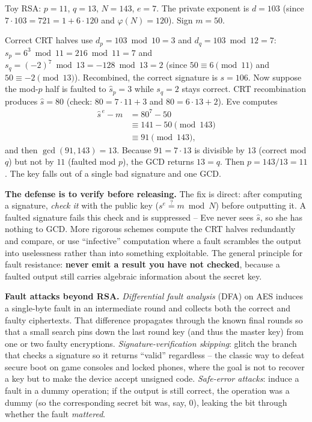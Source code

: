 \begin{example}
\label{ch37:bellcore-example}
Toy RSA: $p = 11$, $q = 13$, $N = 143$, $e = 7$. The private exponent is $d = 103$ (since $7 \cdot 103 = 721 = 1 + 6\cdot 120$ and $\varphi(N)=120$). Sign $m = 50$.

Correct CRT halves use $d_p = 103 \bmod 10 = 3$ and $d_q = 103 \bmod 12 = 7$: $s_p = 6^{3} \bmod 11 = 216 \bmod 11 = 7$ and $s_q = (-2)^{7} \bmod 13 = -128 \bmod 13 = 2$ (since $50 \equiv 6 \pmod{11}$ and $50 \equiv -2 \pmod{13}$). Recombined, the correct signature is $s = 106$. Now suppose the mod-$p$ half is faulted to $\hat{s}_p = 3$ while $s_q = 2$ stays correct. CRT recombination produces $\hat{s} = 80$ (check: $80 = 7\cdot 11 + 3$ and $80 = 6 \cdot 13 + 2$). Eve computes
\begin{align*}
\hat{s}^{\,e} - m &= 80^{7} - 50 \\
&\equiv 141 - 50 \pmod{143} \\
&\equiv 91 \pmod{143},
\end{align*}
and then $\gcd(91, 143) = 13$.
Because $91 = 7 \cdot 13$ is divisible by $13$ (correct mod $q$) but not by $11$ (faulted mod $p$), the GCD returns $13 = q$. Then $p = 143/13 = 11$. The key falls out of a single bad signature and one GCD.
\end{example}


\begin{whybox}
\textbf{The defense is to verify before releasing.} The fix is direct: after computing a signature, \emph{check it} with the public key ($s^{e} \stackrel{?}{=} m \bmod N$) before outputting it. A faulted signature fails this check and is suppressed -- Eve never sees $\hat{s}$, so she has nothing to GCD. More rigorous schemes compute the CRT halves redundantly and compare, or use ``infective'' computation where a fault scrambles the output into uselessness rather than into something exploitable. The general principle for fault resistance: \textbf{never emit a result you have not checked}, because a faulted output still carries algebraic information about the secret key.
\end{whybox}

\begin{attackbox}
\textbf{Fault attacks beyond RSA.} \emph{Differential fault analysis} (DFA) on AES induces a single-byte fault in an intermediate round and collects both the correct and faulty ciphertexts. That difference propagates through the known final rounds so that a small search pins down the last round key (and thus the master key) from one or two faulty encryptions. \emph{Signature-verification skipping}: glitch the branch that checks a signature so it returns ``valid'' regardless -- the classic way to defeat secure boot on game consoles and locked phones, where the goal is not to recover a key but to make the device accept unsigned code. \emph{Safe-error attacks}: induce a fault in a dummy operation; if the output is still correct, the operation was a dummy (so the corresponding secret bit was, say, 0), leaking the bit through whether the fault \emph{mattered}.
\end{attackbox}

